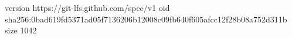 version https://git-lfs.github.com/spec/v1
oid sha256:0bad619fd5371ad05f7136206b12008c09fb640f605afcc12f28b08a752d311b
size 1042
